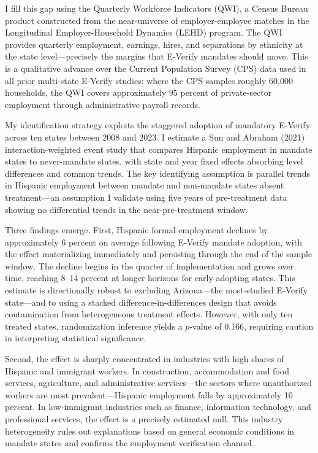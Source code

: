 \documentclass[12pt]{article}
\begin{document}
I fill this gap using the Quarterly Workforce Indicators (QWI), a Census Bureau product constructed from the near-universe of employer-employee matches in the Longitudinal Employer-Household Dynamics (LEHD) program. The QWI provides quarterly employment, earnings, hires, and separations by ethnicity at the state level---precisely the margins that E-Verify mandates should move. This is a qualitative advance over the Current Population Survey (CPS) data used in all prior multi-state E-Verify studies: where the CPS samples roughly 60,000 households, the QWI covers approximately 95 percent of private-sector employment through administrative payroll records.

My identification strategy exploits the staggered adoption of mandatory E-Verify across ten states between 2008 and 2023. I estimate a Sun and Abraham (2021) interaction-weighted event study that compares Hispanic employment in mandate states to never-mandate states, with state and year fixed effects absorbing level differences and common trends. The key identifying assumption is parallel trends in Hispanic employment between mandate and non-mandate states absent treatment---an assumption I validate using five years of pre-treatment data showing no differential trends in the near-pre-treatment window.

Three findings emerge. First, Hispanic formal employment declines by approximately 6 percent on average following E-Verify mandate adoption, with the effect materializing immediately and persisting through the end of the sample window. The decline begins in the quarter of implementation and grows over time, reaching 8--14 percent at longer horizons for early-adopting states. This estimate is directionally robust to excluding Arizona---the most-studied E-Verify state---and to using a stacked difference-in-differences design that avoids contamination from heterogeneous treatment effects. However, with only ten treated states, randomization inference yields a $p$-value of 0.166, requiring caution in interpreting statistical significance.

Second, the effect is sharply concentrated in industries with high shares of Hispanic and immigrant workers. In construction, accommodation and food services, agriculture, and administrative services---the sectors where unauthorized workers are most prevalent---Hispanic employment falls by approximately 10 percent. In low-immigrant industries such as finance, information technology, and professional services, the effect is a precisely estimated null. This industry heterogeneity rules out explanations based on general economic conditions in mandate states and confirms the employment verification channel.
\end{document}
